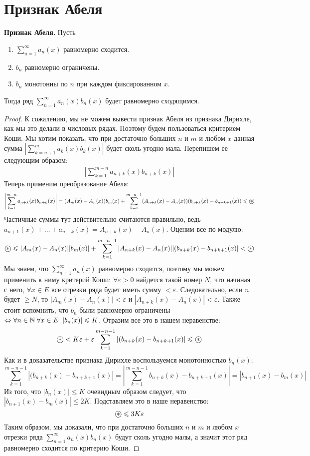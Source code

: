 \section{Признак Абеля}
\textbf{Признак Абеля.} Пусть \begin{enumerate}
    \item $\sum\limits_{n = 1}^\infty a_n(x)$ равномерно сходится.
    \item $b_n$ равномерно ограничены.
    \item $b_n$ монотонны по $n$ при каждом фиксированном $x$.
\end{enumerate}
Тогда ряд $\sum\limits_{n = 1}^\infty a_n(x)b_n(x)$ будет равномерно сходящимся.

\begin{proof}
    К сожалению, мы не можем вывести признак Абеля из признака Дирихле, как мы это делали в числовых рядах.
    Поэтому будем пользоваться критерием Коши. 
    Мы хотим показать, что при достаточно больших $n$ и $m$ и любом $x$ данная сумма $\left| \sum\limits_{k = n + 1}^m a_k(x)b_k(x) \right|$ будет сколь угодно мала.
    Перепишем ее следующим образом:
    \begin{gather*}
        \left| \sum\limits_{k = 1}^{m-n} a_{n+k}(x)b_{n+k}(x) \right|
    \end{gather*} 
    Теперь применим преобразование Абеля: 
    \[ \left| \sum\limits_{k = 1}^{m-n} a_{n+k}(x)b_{n+k}(x) \right| = (A_m(x) - A_n(x))b_m(x) + \sum_{k = 1}^{m - n - 1} (A_{n+k}(x) - A_n(x))(b_{n+k}(x) - b_{n+k+1}(x)) \leqslant \oast \]
    \quad Частичные суммы тут действительно считаются правильно, ведь $a_{n+1}(x) + \dots + a_{n+k}(x) = A_{n+k}(x) - A_n(x)$.
    Оценим все по модулю: \[ \oast \leqslant |A_m(x) - A_n(x)||b_m(x)| + \sum_{k = 1}^{m - n - 1} |A_{n+k}(x) - A_n(x)||(b_{n+k}(x) - b_{n+k+1}(x)| < \oast \]
    \quad Мы знаем, что $\sum\limits_{n = 1}^\infty a_n(x)$ равномерно сходится, поэтому мы можем применить к ниму критерий Коши: $\forall \varepsilon > 0$ найдется такой номер $N$, что начиная с него, $\forall x \in E$ все отрезки ряда будет иметь сумму $<\varepsilon$.
    Следовательно, если $n$ будет $\geqslant N$, то $|A_m(x) - A_n(x)| < \varepsilon$ и $|A_{n+k}(x) - A_n(x)| < \varepsilon$.
    Также стоит вспомнить, что $b_n$ были равномерно ограничены $\Leftrightarrow \forall n \in \mathbb{N} \; \forall x \in E \;\; |b_n(x)| \leqslant K$.
    Отразим все это в нашем неравенстве: \[ \oast < K\varepsilon + \varepsilon \sum_{k = 1}^{m - n - 1} |(b_{n+k}(x) - b_{n+k+1}(x)| \leqslant \oast \]
    \quad Как и в доказательстве признака Дирихле воспользуемся монотонностью $b_n(x)$:
    \[ \sum_{k = 1}^{m - n - 1} |(b_{n+k}(x) - b_{n+k+1}(x)| = \left|\sum_{k = 1}^{m - n - 1} b_{n+k}(x) - b_{n+k+1}(x) \right| = |b_{n+1}(x) - b_m(x)| \]
    \quad Из того, что $|b_n(x)| \leqslant K$ очевидным образом следует, что $|b_{n+1}(x) - b_m(x)| \leqslant 2K$. 
    Подставляем это в наше неравенство: \[ \oast \leqslant 3K\varepsilon  \]
    \quad Таким образом, мы доказали, что при достаточно больших $n$ и $m$ и любом $x$ отрезки ряда $\sum\limits_{n = 1}^\infty a_n(x)b_n(x)$ будут сколь угодно малы, а значит этот ряд равномерно сходится по критерию Коши.
\end{proof}
